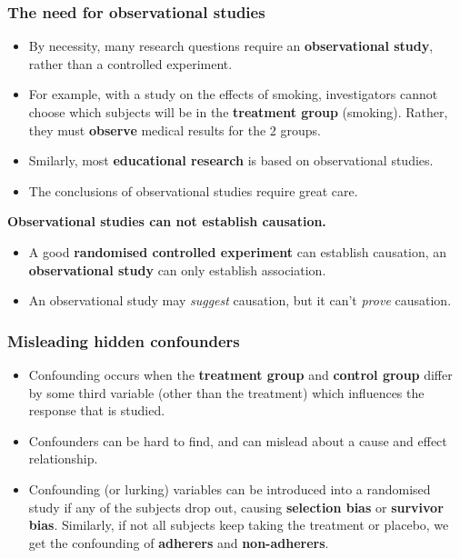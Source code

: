 \documentclass[a4paper]{article}\usepackage[]{graphicx}\usepackage[]{xcolor}
\begin{document}
\subsubsection{The need for observational studies}
\begin{itemize}
	\item By necessity, many research questions require an \textbf{observational study}, rather than a controlled experiment.
	\item For example, with a study on the effects of smoking, investigators cannot choose which subjects will be in the \textbf{\textcolor{mygreen}{treatment group}} (smoking). Rather, they must \textbf{observe} medical results for the 2 groups.
	\item Smilarly, most \textbf{educational research} is based on observational studies.
	\item The conclusions of observational studies require great care.
\end{itemize}
\begin{goldbox}
	\textbf{Observational studies can not establish causation.}
\end{goldbox}
\begin{itemize}
\item A good \textbf{randomised controlled experiment} can establish causation, an \textbf{observational study} can only establish association.
\item An observational study may \textit{suggest} causation, but it can't \textit{prove} causation.
\end{itemize}
\subsubsection{Misleading hidden confounders}
\begin{itemize}
	\item Confounding occurs when the \textbf{\textcolor{mygreen}{treatment group}} and \textbf{\textcolor{myred}{control group}} differ by some third variable (other than the treatment) which influences the response that is studied.
	\item Confounders can be hard to find, and can mislead about a cause and effect relationship.
	\item Confounding (or lurking) variables can be introduced into a randomised study if any of the subjects drop out, causing \textbf{selection bias} or \textbf{survivor bias}. Similarly, if not all subjects keep taking the treatment or placebo, we get the confounding of \textbf{adherers} and \textbf{non-adherers}.
\end{itemize}
\end{document}
